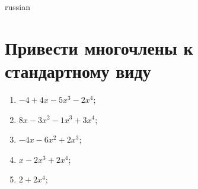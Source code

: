 \documentclass[a4paper]{article}
\begin{document}
\begin{otherlanguage*}{russian}

\section{Привести многочлены к стандартному виду}
\begin{enumerate}
\item $-4 + 4x-5x^3-2x^4$;
\item $8x-3x^2-1x^3 + 3x^4$;
\item $-4x-6x^2 + 2x^3$;
\item $x-2x^3 + 2x^4$;
\item $2 + 2x^4$;
\end{enumerate}
\end{otherlanguage*}
\end{document}
